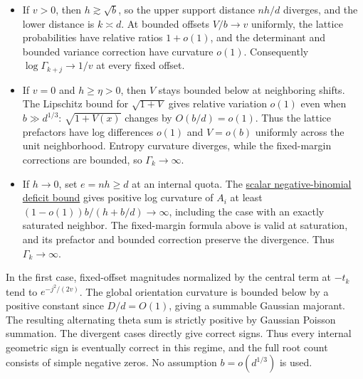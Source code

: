 \begin{itemize}
\item If $v>0$, then $h\gtrsim\sqrt b$, so the upper support distance $nh/d$ diverges, and the lower distance is $k\asymp d$. At bounded offsets $V/b\to v$ uniformly, the lattice probabilities have relative ratios $1+o(1)$, and the determinant and bounded variance correction have curvature $o(1)$. Consequently $\log\Gamma_{k+j}\to1/v$ at every fixed offset.
\item If $v=0$ and $h\ge\eta>0$, then $V$ stays bounded below at neighboring shifts. The Lipschitz bound for $\sqrt{1+V}$ gives relative variation $o(1)$ even when $b\gg d^{1/3}$: $\sqrt{1+V(x)}$ changes by $O(b/d)=o(1)$. Thus the lattice prefactors have log differences $o(1)$ and $V=o(b)$ uniformly across the unit neighborhood. Entropy curvature diverges, while the fixed-margin corrections are bounded, so $\Gamma_k\to\infty$.
\item If $h\to0$, set $e=nh\ge d$ at an internal quota. The \href{https://github.com/ProgramComputer/open-math-research/blob/04564a728c21eab6ce511b98a48ccaac754648ff/topics/balanced-arrays/very-tall/very-tall-upper-quota.md#the-last-od-quotas}{scalar negative-binomial deficit bound} gives positive log curvature of $A_i$ at least $(1-o(1))b/(h+b/d)\to\infty$, including the case with an exactly saturated neighbor. The fixed-margin formula above is valid at saturation, and its prefactor and bounded correction preserve the divergence. Thus $\Gamma_k\to\infty$.
\end{itemize}

In the first case, fixed-offset magnitudes normalized by the central term at $-t_k$ tend to $e^{-j^2/(2v)}$. The global orientation curvature is bounded below by a positive constant since $D/d=O(1)$, giving a summable Gaussian majorant. The resulting alternating theta sum is strictly positive by Gaussian Poisson summation. The divergent cases directly give correct signs. Thus every internal geometric sign is eventually correct in this regime, and the full root count consists of simple negative zeros. No assumption $b=o(d^{1/3})$ is used.
